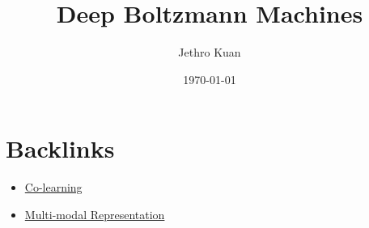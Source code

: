 \documentclass[11pt]{article}
\author{Jethro Kuan}
\date{\today}
\title{Deep Boltzmann Machines}
\begin{document}
\maketitle
\tableofcontents


\section{Backlinks}
\label{sec:org3f00f8f}
\begin{itemize}
\item \href{colearning.org}{Co-learning}
\item \href{multimodal\_representation.org}{Multi-modal Representation}
\end{itemize}
\end{document}
